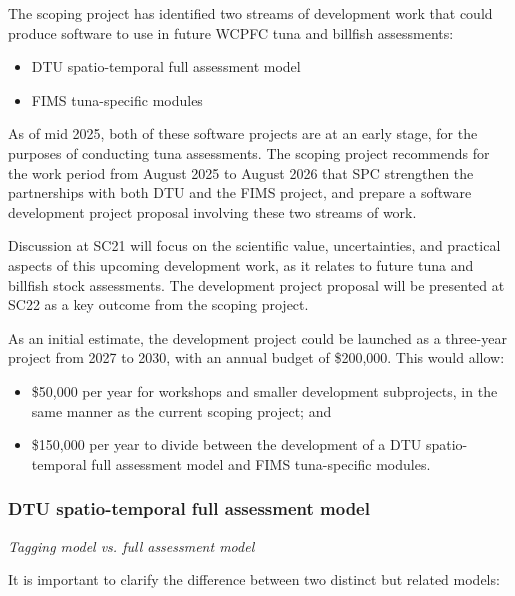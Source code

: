\documentclass{SCreport}
\begin{document}
\vspace{2ex}

The scoping project has identified two streams of development work that could
produce software to use in future WCPFC tuna and billfish assessments:

\begin{itemize}
  \item DTU spatio-temporal full assessment model\\[-4.5ex]
  \item FIMS tuna-specific modules
\end{itemize}

As of mid 2025, both of these software projects are at an early stage, for the
purposes of conducting tuna assessments. The scoping project recommends for the
work period from August 2025 to August 2026 that SPC strengthen the partnerships
with both DTU and the FIMS project, and prepare a software development project
proposal involving these two streams of work.

Discussion at SC21 will focus on the scientific value, uncertainties, and
practical aspects of this upcoming development work, as it relates to future
tuna and billfish stock assessments. The development project proposal will be
presented at SC22 as a key outcome from the scoping project.

As an initial estimate, the development project could be launched as a
three-year project from 2027 to 2030, with an annual budget of \$200,000. This
would allow:

\begin{itemize}
  \item \$50,000 per year for workshops and smaller development subprojects, in
  the same manner as the current scoping project; and
  \item \$150,000 per year to divide between the development of a DTU
  spatio-temporal full assessment model and FIMS tuna-specific modules.
\end{itemize}

\subsubsection{DTU spatio-temporal full assessment model}

\vspace{1ex}

\textit{Tagging model vs. full assessment model}

It is important to clarify the difference between two distinct but related
models:
\end{document}
